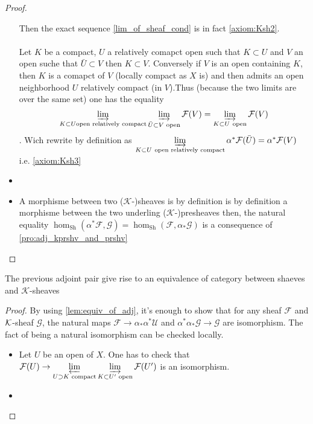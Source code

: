 \begin{proof}
\begin{itemize}
        Then the exact sequence \eqref{lim_of_sheaf_cond} is in fact \eqref{axiom:Ksh2}.\\ \\


        Let $K$ be a compact, $U$ a relatively comapct open such that $K\subset U$ and $V$ an open suche that $\bar{U}\subset V$ then $K\subset V$. Conversely if $V$ is an open containing $K$, then $K$ is a comapct of $V$ (locally compact as $X$ is) and then admits an open neighborhood $U$ relatively compact (in $V$).Thus (because the two limits are over the same set) one has the equality \[\varinjlim\limits_{K\subset U \text{open relatively compact}}\varinjlim\limits_{\bar{U}\subset V\text{ open}}\mathcal{F}(V)=\varinjlim\limits_{K\subset U\ \text{open}}\mathcal{F}(V)\]. Wich rewrite by definition as $\varinjlim\limits_{K\subset U\ \text{open relatively compact}}\alpha^*\mathcal{F}(\bar{U})=\alpha^*\mathcal{F}(V)$ i.e. \eqref{axiom:Ksh3}




        \item
        \item A morphisme between two ($\mathcal{K}$-)sheaves is by definition is by definition a morphisme between the two underling ($\mathcal{K}$-)presheaves then, the natural equality $\hom_{\text{Sh}}(\alpha^*\mathcal{F},\mathcal{G})=\hom_{\text{Sh}}(\mathcal{F},\alpha_*\mathcal{G})$ is a consequence of \ref{pro:adj_kprshv_and_prshv}
    \end{itemize}
\end{proof}

\begin{lemma}\label{lem:kshv_equiv_shv}
    The previous adjoint pair give rise to an equivalence of category between shaeves and $\mathcal{K}$-sheaves
\end{lemma}

\begin{proof}
    By using \ref{lem:equiv_of_adj}, it's enough to show that for any sheaf $\mathcal{F}$ and $\mathcal{K}$-sheaf $\mathcal{G}$, the natural maps $\mathcal{F}\to \alpha_*\alpha^*\mathcal{U}$ and $\alpha^*\alpha_*\mathcal{G}\to \mathcal{G}$ are isomorphism. The fact of being a natural isomorphism can be checked locally.\begin{itemize}
        \item Let $U$ be an open of $X$. One has to check that $\mathcal{F}(U)\to \varprojlim\limits_{U\supset K \text{ compact}}\varinjlim\limits_{K\subset U' \text{ open}}\mathcal{F}(U')$ is an isomorphism.
        \item
    \end{itemize}
\end{proof}